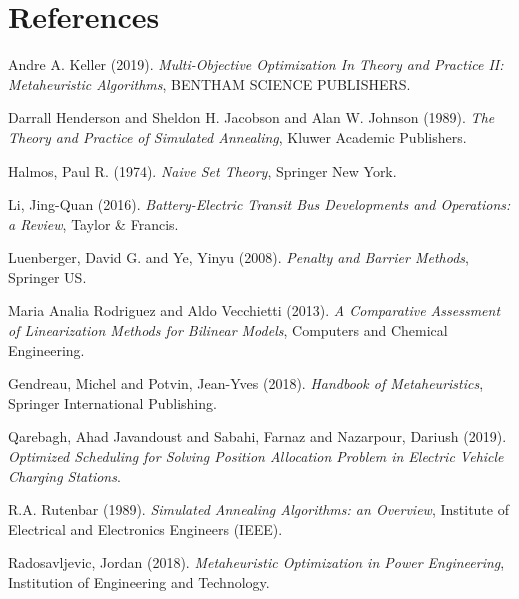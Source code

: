 \documentclass[11pt,a4paper,final]{article}
\begin{document}
\section{References}
\label{sec:org0512ff9}
\noindent
Andre A. Keller (2019). \emph{Multi-Objective Optimization In Theory and Practice {II}: Metaheuristic Algorithms}, {BENTHAM} {SCIENCE} {PUBLISHERS}.

\noindent
Darrall Henderson and Sheldon H. Jacobson and Alan W. Johnson (1989). \emph{The Theory and Practice of Simulated Annealing}, Kluwer Academic Publishers.

\noindent
Halmos, Paul R. (1974). \emph{Naive Set Theory}, Springer New York.

\noindent
Li, Jing-Quan (2016). \emph{Battery-Electric Transit Bus Developments and Operations: a Review}, Taylor \& Francis.

\noindent
Luenberger, David G. and Ye, Yinyu (2008). \emph{Penalty and Barrier Methods}, Springer US.

\noindent
Maria Analia Rodriguez and Aldo Vecchietti (2013). \emph{A Comparative Assessment of Linearization Methods for Bilinear Models}, Computers and Chemical Engineering.

\noindent
Gendreau, Michel and Potvin, Jean-Yves (2018). \emph{Handbook of Metaheuristics}, Springer International Publishing.

\noindent
Qarebagh, Ahad Javandoust and Sabahi, Farnaz and Nazarpour, Dariush (2019). \emph{Optimized Scheduling for Solving Position Allocation Problem in Electric Vehicle Charging Stations}.

\noindent
R.A. Rutenbar (1989). \emph{Simulated Annealing Algorithms: an Overview}, Institute of Electrical and Electronics Engineers ({IEEE}).

\noindent
Radosavljevic, Jordan (2018). \emph{Metaheuristic Optimization in Power Engineering}, Institution of Engineering and Technology.
\end{document}
